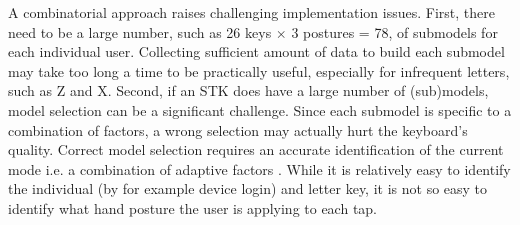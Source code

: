 \documentclass{sigchi}
\begin{document}
A combinatorial approach raises challenging implementation issues. First, there need to be a large number, such as 26 keys $\times$ 3 postures = 78, of submodels for each individual user. Collecting sufficient amount of data to build each submodel may take too long a time to be practically useful, especially for infrequent letters, such as Z and X. Second, if an STK does have a large number of (sub)models, model selection can be a significant challenge.  Since each submodel is specific to a combination of factors, a wrong selection may actually hurt the keyboard’s quality. Correct model selection requires an accurate identification of the current mode i.e. a combination of adaptive factors . While it is relatively easy to identify the individual (by for example device login) and letter key, it is not so easy to identify what hand posture the user is applying to each tap. 
\end{document}
